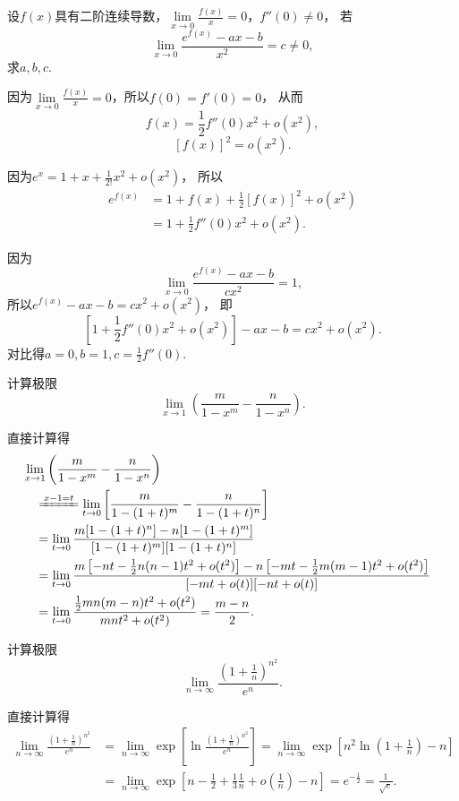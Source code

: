 \begin{example}
\def\l{\lim\limits_{x\to0}}
设\(f(x)\)具有二阶连续导数，\(\l \frac{f(x)}{x} = 0\)，\(f''(0)\neq0\)，
若\[
	\l \frac{e^{f(x)}-ax-b}{x^2} = c \neq 0,
\]
求\(a,b,c\).
\begin{solution}
因为\(\l \frac{f(x)}{x} = 0\)，所以\(f(0) = f'(0) = 0\)，
从而\[
	f(x) = \frac{1}{2} f''(0) x^2 + o(x^2),
\]\[
	[f(x)]^2 = o(x^2).
\]

因为\(e^x = 1 + x + \frac{1}{2!} x^2 + o(x^2)\)，
所以\begin{align*}
	e^{f(x)} &= 1 + f(x) + \frac{1}{2} [f(x)]^2 + o(x^2) \\
	&= 1 + \frac{1}{2} f''(0) x^2 + o(x^2).
\end{align*}

因为\[
	\l \frac{e^{f(x)} - ax - b}{c x^2} = 1,
\]
所以\(e^{f(x)} - ax - b = c x^2 + o(x^2)\)，
即\[
	\left[ 1 + \frac{1}{2} f''(0) x^2 + o(x^2) \right] - ax - b = c x^2 + o(x^2).
\]
对比得\(a = 0, b = 1, c = \frac{1}{2} f''(0)\).
\end{solution}
\end{example}

\begin{example}
计算极限\[
	\lim\limits_{x\to1} \left(\frac{m}{1-x^m} - \frac{n}{1-x^n}\right).
\]
\begin{solution}
直接计算得
\begin{align*}
	&\hspace{-10pt}
	\lim\limits_{x\to1} \left(\frac{m}{1-x^m} - \frac{n}{1-x^n}\right) \\
	&\xlongequal{x-1=t}
	\lim\limits_{t\to0} \left[\frac{m}{1-(1+t)^m}-\frac{n}{1-(1+t)^n}\right] \\
	&=
	\lim\limits_{t\to0} \frac{m[1-(1+t)^n]-n[1-(1+t)^m]}{[1-(1+t)^m][1-(1+t)^n]} \\
	&=
	\lim\limits_{t\to0} \frac{m\left[-nt-\frac{1}{2}n(n-1)t^2+o(t^2)\right]
		-n\left[-mt-\frac{1}{2}m(m-1)t^2+o(t^2)\right]}{[-mt+o(t)][-nt+o(t)]} \\
	&=
	\lim\limits_{t\to0} \frac{\frac{1}{2}mn(m-n)t^2+o(t^2)}{mnt^2+o(t^2)}
	= \frac{m-n}{2}.
\end{align*}
\end{solution}
\end{example}

\begin{example}
\def\l{\lim\limits_{n\to\infty}}%
计算极限\[
	\l \frac{\left(1+\frac{1}{n}\right)^{n^2}}{e^n}.
\]
\begin{solution}
直接计算得
\begin{align*}
	\l \frac{\left(1+\frac{1}{n}\right)^{n^2}}{e^n}
	&= \l \exp[\ln\frac{\left(1+\frac{1}{n}\right)^{n^2}}{e^n}]
	= \l \exp[ n^2 \ln(1+\frac{1}{n}) - n ] \\
	&= \l \exp[ n - \frac{1}{2} + \frac{1}{3} \frac{1}{n} + o\left(\frac{1}{n}\right) - n ]
	= e^{-\frac{1}{2}}
	= \frac{1}{\sqrt{e}}.
\end{align*}
\end{solution}
\end{example}

